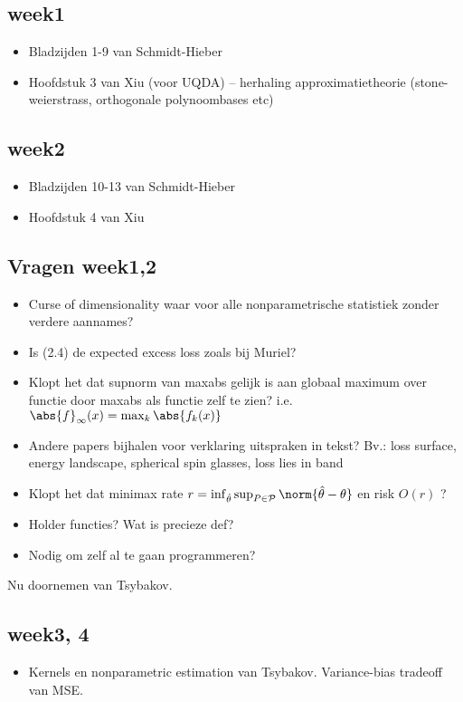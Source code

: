 \subsection*{week1}
\begin{itemize}
    \item Bladzijden 1-9 van Schmidt-Hieber
    \item Hoofdstuk 3 van Xiu (voor UQDA) -- herhaling approximatietheorie (stone-weierstrass, orthogonale polynoombases etc)
\end{itemize}



\subsection*{week2}
\begin{itemize}
    \item Bladzijden 10-13 van Schmidt-Hieber
    \item Hoofdstuk 4 van Xiu
\end{itemize}

\subsection*{Vragen week1,2}
\begin{itemize}
    \item Curse of dimensionality waar voor alle nonparametrische statistiek zonder verdere aannames?
    \item Is (2.4) de expected excess loss zoals bij Muriel?
    \item Klopt het dat supnorm van maxabs gelijk is aan globaal maximum over functie door maxabs als functie zelf te zien? i.e. $\abs{f}_{\infty}(x) = \max_{k} \abs{f_k(x)}$
    \item Andere papers bijhalen voor verklaring uitspraken in tekst? Bv.: loss surface, energy landscape, spherical spin glasses, loss lies in band
    \item Klopt het dat minimax rate $r = \inf_{\hat \theta} \sup_{P \in \mathcal{P}} \norm{\hat \theta - \theta}$  en risk $O(r)$ ?
    \item Holder functies? Wat is precieze def?
    \item Nodig om zelf al te gaan programmeren?
\end{itemize}


Nu doornemen van Tsybakov.


\subsection*{week3, 4}
\begin{itemize}
    \item Kernels en nonparametric estimation van Tsybakov. Variance-bias tradeoff van MSE.
\end{itemize}


